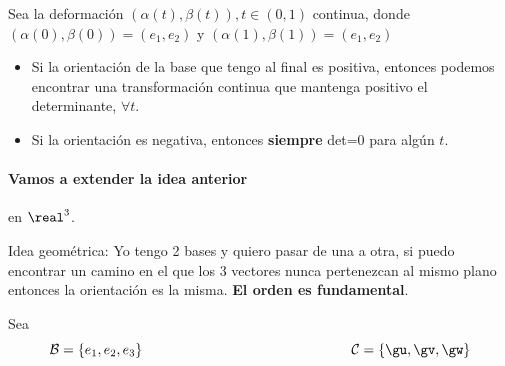 Sea la deformación $(\alpha(t),\beta(t)), t\in(0,1)$ continua, donde $(\alpha(0),\beta(0)) = (e_1,e_2)$ y $(\alpha(1),\beta(1)) = (e_1,e_2)$

\begin{itemize}
\item
Si la orientación de la base que tengo al final es positiva, entonces podemos encontrar una transformación continua que mantenga positivo el determinante, $\forall t$. 
\item
Si la orientación es negativa, entonces \textbf{siempre} det=0 para algún $t$.
\end{itemize}

\paragraph{Vamos a extender la idea anterior} en $\real^3$.

Idea geométrica: Yo tengo 2 bases y quiero pasar de una a otra, si puedo encontrar un camino en el que los 3 vectores nunca pertenezcan al mismo plano entonces la orientación es la misma. \textbf{El orden es fundamental}. 

Sea 
\[\mathcal{B} = \{e_1,e_2,e_3\} \hspace*{150pt} \mathcal{C} = \{\gu,\gv,\gw\}\]


\hspace*{50pt}
\hspace*{100pt}

